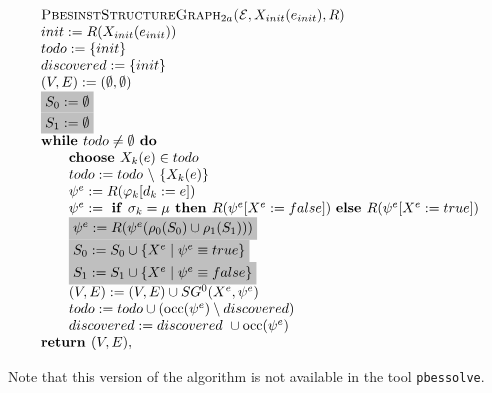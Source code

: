 \documentclass{article}
\newcommand{\Space}{\text{\ }}
\newcommand{\If}{\text{\textbf{if }}}
\newcommand{\Do}{\text{\textbf{ do }}}
\newcommand{\Then}{\text{\textbf{ then }}}
\newcommand{\Else}{\text{\textbf{else }}}
\newcommand{\While}{\text{\textbf{while }}}
\newcommand{\Choose}{\text{\textbf{choose }}}
\newcommand{\Return}{\text{\textbf{return }}}
\begin{document}
\begin{equation*}
\begin{array}{l}
\textsc{PbesinstStructureGraph$_{2a}$(}\mathcal{E}, X_{init}(e_{init}), R) \\ 
init:=R(X_{init}(e_{init})) \\
todo:=\{init\} \\
discovered:=\{init\} \\
(V,E) :=(\emptyset ,\emptyset ) \\ 
\colorbox{lightgray}{$%
S_0:= \emptyset $}\\
\colorbox{lightgray}{$%
S_1:= \emptyset $}\\
\While todo\neq \emptyset \Do \\ 
\qquad \Choose X_{k}(e)\in todo \\ 
\qquad todo:=todo\ \backslash \ \{X_{k}(e)\} \\ 
\qquad \psi ^{e}:=R(\varphi _{k}[d_{k}:=e]) \\ 
\qquad \psi^e := \Space \If \sigma_k = \mu \Then R(\psi^e[X^e := false])
\Space \Else R(\psi^e[X^e := true]) \\
\qquad \colorbox{lightgray}{$%
\psi^{e} := R(\psi^e (\rho_0(S_0) \cup \rho_1(S_1) ) ) $}\\
\qquad \colorbox{lightgray}{$%
S_0 := S_0 \cup \{ X^e \mid \psi^e \equiv true \} $}\\
\qquad \colorbox{lightgray}{$%
S_1 := S_1 \cup \{ X^e \mid \psi^e \equiv false \} $}\\
\qquad (V,E) := (V,E) \cup SG^{0}(X^{e},\psi ^{e}) \\ 
\qquad todo:=todo\cup (\mathrm{occ}(\psi ^{e})\setminus discovered) \\
\qquad discovered:=discovered\ \cup \mathrm{occ}(\psi ^{e}) \\
\Return (V, E),%
\end{array}%
\end{equation*}%

Note that this version of the algorithm is not available in the tool \texttt{pbessolve}.
\end{document}
